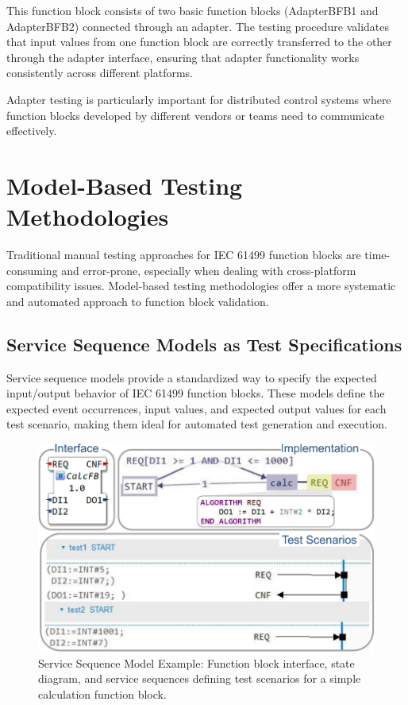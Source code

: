 This function block consists of two basic function blocks (AdapterBFB1 and AdapterBFB2) connected through an adapter. The testing procedure validates that input values from one function block are correctly transferred to the other through the adapter interface, ensuring that adapter functionality works consistently across different platforms.

Adapter testing is particularly important for distributed control systems where function blocks developed by different vendors or teams need to communicate effectively.

\section{Model-Based Testing Methodologies}

Traditional manual testing approaches for IEC 61499 function blocks are time-consuming and error-prone, especially when dealing with cross-platform compatibility issues. Model-based testing methodologies offer a more systematic and automated approach to function block validation.

\subsection{Service Sequence Models as Test Specifications}

Service sequence models provide a standardized way to specify the expected input/output behavior of IEC 61499 function blocks. These models define the expected event occurrences, input values, and expected output values for each test scenario, making them ideal for automated test generation and execution.

\begin{figure}[!htbp]
    \centering
    \includegraphics[width=0.75\columnwidth]{MX_Papers/Paper9/Figures/running_example-crop.pdf}
    \caption{Service Sequence Model Example: Function block interface, state diagram, and service sequences defining test scenarios for a simple calculation function block.}
    \label{fig:service_sequence}
\end{figure}

